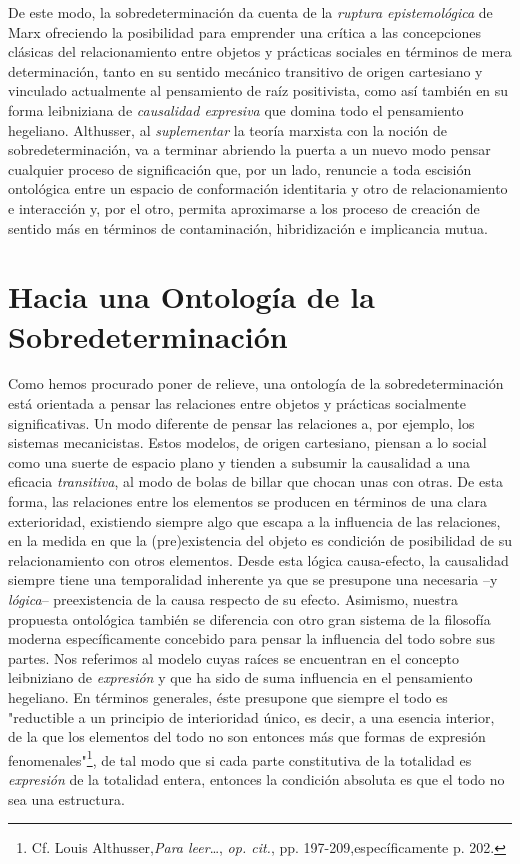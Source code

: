 \documentclass{book}
\begin{document}
De este modo, la sobredeterminación da cuenta de la \emph{ruptura
epistemológica} de Marx ofreciendo la posibilidad para emprender una
crítica a las concepciones clásicas del relacionamiento entre objetos y
prácticas sociales en términos de mera determinación, tanto en su
sentido mecánico transitivo de origen cartesiano y vinculado actualmente
al pensamiento de raíz positivista, como así también en su forma
leibniziana de \emph{causalidad expresiva} que domina todo el
pensamiento hegeliano. Althusser, al \emph{suplementar} la teoría
marxista con la noción de sobredeterminación, va a terminar abriendo la
puerta a un nuevo modo pensar cualquier proceso de significación que,
por un lado, renuncie a toda escisión ontológica entre un espacio de
conformación identitaria y otro de relacionamiento e interacción y, por
el otro, permita aproximarse a los proceso de creación de sentido más en
términos de contaminación, hibridización e implicancia mutua.

\hypertarget{hacia-una-ontologuxeda-de-la-sobredeterminaciuxf3n}{%
\section{Hacia una Ontología de la Sobredeterminación}\label{hacia-una-ontologuxeda-de-la-sobredeterminaciuxf3n}}

Como hemos procurado poner de relieve, una ontología de la
sobredeterminación está orientada a pensar las relaciones entre objetos
y prácticas socialmente significativas. Un modo diferente de pensar las
relaciones a, por ejemplo, los sistemas mecanicistas. Estos modelos, de
origen cartesiano, piensan a lo social como una suerte de espacio plano
y tienden a subsumir la causalidad a una eficacia \emph{transitiva}, al
modo de bolas de billar que chocan unas con otras. De esta forma, las
relaciones entre los elementos se producen en términos de una clara
exterioridad, existiendo siempre algo que escapa a la influencia de las
relaciones, en la medida en que la (pre)existencia del objeto es
condición de posibilidad de su relacionamiento con otros elementos.
Desde esta lógica causa-efecto, la causalidad siempre tiene una
temporalidad inherente ya que se presupone una necesaria --y
\emph{lógica}-- preexistencia de la causa respecto de su efecto.
Asimismo, nuestra propuesta ontológica también se diferencia con otro
gran sistema de la filosofía moderna específicamente concebido para
pensar la influencia del todo sobre sus partes. Nos referimos al modelo
cuyas raíces se encuentran en el concepto leibniziano de
\emph{expresión} y que ha sido de suma influencia en el pensamiento
hegeliano. En términos generales, éste presupone que siempre el todo es
"reductible a un principio de interioridad único, es decir, a una
esencia interior, de la que los elementos del todo no son entonces más
que formas de expresión fenomenales"\footnote{Cf. Louis
  Althusser,\emph{Para leer}\ldots, \emph{op. cit.}, pp.
  197-209,específicamente p. 202.}, de tal modo que si cada parte
constitutiva de la totalidad es \emph{expresión} de la totalidad entera,
entonces la condición absoluta es que el todo no sea una estructura.
\end{document}
